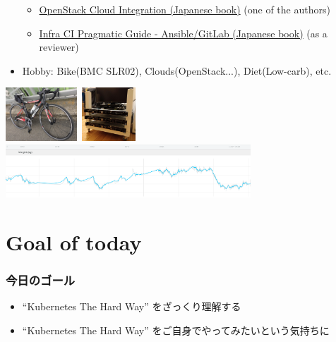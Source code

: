 \documentclass[aspectratio=169,11pt,hyperref={colorlinks=true}]{beamer}
\begin{document}
\begin{frame}
\begin{itemize}
      \begin{itemize}
      \item \href{https://www.amazon.co.jp/dp/4798139785/}{\scriptsize{OpenStack
        Cloud Integration (Japanese book)}} (one of the authors)
      \item \href{https://www.amazon.co.jp/dp/4798155128/}{\scriptsize{Infra CI
        Pragmatic Guide - Ansible/GitLab (Japanese book)}} (as a reviewer)
      \end{itemize}
    \item Hobby: Bike(BMC SLR02), Clouds(OpenStack...), Diet(Low-carb), etc.
  \end{itemize}
  \includegraphics[height=20mm]{images/my-bike.jpg}~\includegraphics[height=20mm]{images/server_front.jpg}~\includegraphics[height=20mm]{images/my-weight.png}
\end{frame}

\section{Goal of today}
\begin{frame}
  \frametitle{今日のゴール}
  \begin{itemize}
    \item ``Kubernetes The Hard Way'' をざっくり理解する
    \item ``Kubernetes The Hard Way'' をご自身でやってみたいという気持ちに
  \end{itemize}
\end{frame}
\end{document}
